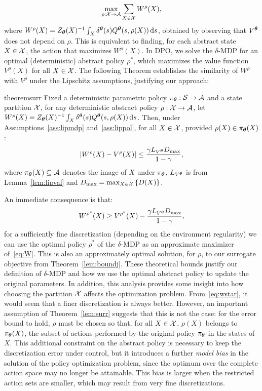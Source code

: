 \begin{align}\label{eq:W}
	\max_{\rho:\mathcal{X}\to\mathcal{A}} \sum_{X\in\mathcal{X}}W^{\rho}(X),
\end{align}
where $W^{\rho}(X) = Z_{\boldsymbol{\theta}}(X)^{-1}\int_{X}\delta^{\boldsymbol{\theta}}(s)Q^{\boldsymbol{\theta}}(s,\rho(X))\,\mathrm{d} s$, obtained by observing that $V^{\boldsymbol{\theta}}$ does not depend on $\rho$. This is equivalent to finding, for each abstract state $X\in\mathcal{X}$, the action that maximizes $W^{\rho}(X)$. In DPO, we solve the $\delta$-MDP for an optimal (deterministic) abstract policy $\rho^{*}$, which maximizes the value function $V^{\rho}(X)$ for all $X\in\mathcal{X}$. The following Theorem establishes the similarity of $W^{\rho}$ with $V^{\rho}$ under the Lipschitz assumptions, justifying our approach: 
%
\begin{restatable}{theorem}{surr}\label{lem:surr}
	Fixed a deterministic parametric policy ${\pi_{\boldsymbol{\theta}}:\mathcal{S}\to\mathcal{A}}$ and a state partition $\mathcal{X}$, for any deterministic abstract policy $\rho:\mathcal{X}\to\mathcal{A}$, let $W^{\rho}(X) = Z_{\boldsymbol{\theta}}(X)^{-1}\int_{X}\delta^{\boldsymbol{\theta}}(s)Q^{\boldsymbol{\theta}}(s,\rho(X))\,\mathrm{d} s$. Then, under Assumptions~\ref{ass:lipmdp} and~\ref{ass:lippol}, for all $X\in\mathcal{X}$, provided $\rho(X) \in \pi_{\boldsymbol{\theta}}(X)$:
	\begin{align*}
	|W^{\rho}(X) - V^{\rho}(X)| \leq \frac{\gamma L_{V^{\boldsymbol{\theta}}}D_{\max}}{1-\gamma},
	\end{align*}
	where $\pi_{\boldsymbol{\theta}}(X)\subseteq\mathcal{A}$ denotes the image of $X$ under $\pi_{\boldsymbol{\theta}}$, $L_{V^{\boldsymbol{\theta}}}$ is from Lemma~\ref{lem:lipval} and $D_{\max} = \max_{X\in\mathcal{X}}\left\{D(X)\right\}$.
\end{restatable}
%
An immediate consequence is that: 
\begin{align}\label{eq:wstar}
	W^{\rho^*}(X) \geq V^{\rho^*}(X) - \frac{\gamma L_{V^{\boldsymbol{\theta}}}D_{\max}}{1-\gamma},
\end{align}
\ie for a sufficiently fine discretization (depending on the environment regularity) we can use the optimal policy $\rho^{*}$ of the $\delta$-MDP as an approximate maximizer of~\eqref{eq:W}. This is also an approximately optimal solution, for $\rho$, to our surrogate objective from Theorem~\ref{lem:boundj}.
%
These theoretical bounds justify our definition of $\delta$-MDP and how we use the optimal abstract policy to update the original parameters.
In addition, this analysis provides some insight into how choosing the partition $\mathcal{X}$ affects the optimization problem. From~\eqref{eq:wstar}, it would seem that a finer discretization is always better. However, an important assumption of Theorem~\ref{lem:surr} suggests that this is not the case: for the error bound to hold, $\rho$ must be chosen so that, for all $X\in\mathcal{X}$, $\rho(X)$ belongs to $\pi_{\boldsymbol{\theta}}(X)$, the subset of actions performed by the original policy $\pi_{\boldsymbol{\theta}}$ in the states of $X$. This additional constraint on the abstract policy is necessary to keep the discretization error under control, but it introduces a further \textit{model bias} in the solution of the policy optimization problem, since the optimum over the complete action space may no longer be attainable. This bias is larger when the restricted action sets are smaller, which may result from very fine discretizations. 
